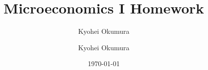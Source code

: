 \documentclass[11pt,a4paper]{article}
\author{Kyohei Okumura}
\begin{document}
\title{Microeconomics I Homework}
\author{Kyohei Okumura}
\date{\today}
\maketitle
\end{document}
